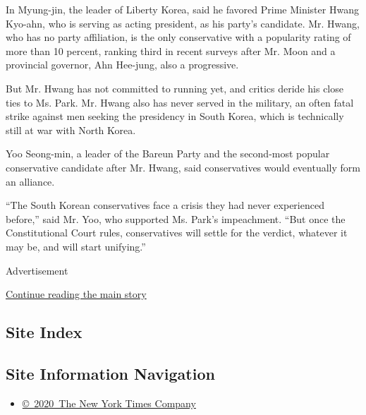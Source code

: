 In Myung-jin, the leader of Liberty Korea, said he favored Prime
Minister Hwang Kyo-ahn, who is serving as acting president, as his
party's candidate. Mr. Hwang, who has no party affiliation, is the only
conservative with a popularity rating of more than 10 percent, ranking
third in recent surveys after Mr. Moon and a provincial governor, Ahn
Hee-jung, also a progressive.

But Mr. Hwang has not committed to running yet, and critics deride his
close ties to Ms. Park. Mr. Hwang also has never served in the military,
an often fatal strike against men seeking the presidency in South Korea,
which is technically still at war with North Korea.

Yoo Seong-min, a leader of the Bareun Party and the second-most popular
conservative candidate after Mr. Hwang, said conservatives would
eventually form an alliance.

``The South Korean conservatives face a crisis they had never
experienced before,'' said Mr. Yoo, who supported Ms. Park's
impeachment. ``But once the Constitutional Court rules, conservatives
will settle for the verdict, whatever it may be, and will start
unifying.''

Advertisement

\protect\hyperlink{after-bottom}{Continue reading the main story}

\hypertarget{site-index}{%
\subsection{Site Index}\label{site-index}}

\hypertarget{site-information-navigation}{%
\subsection{Site Information
Navigation}\label{site-information-navigation}}

\begin{itemize}
\tightlist
\item
  \href{https://help.nytimes.com/hc/en-us/articles/115014792127-Copyright-notice}{©~2020~The
  New York Times Company}
\end{itemize}

